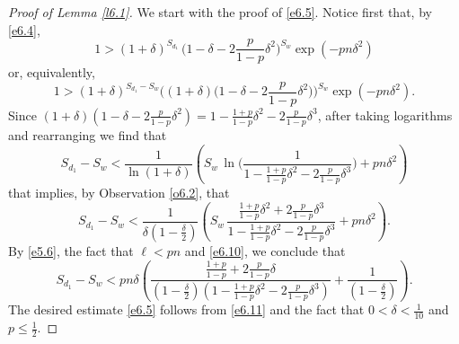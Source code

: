 \documentclass[10pt,a4paper]{amsart}
\theoremstyle{remark}
\newcommand{\mik}{\leqslant}
\begin{document}
\begin{proof}[Proof of Lemma \emph{\ref{l6.1}}]
We start with the proof of \eqref{e6.5}. Notice first that, by \eqref{e6.4},
\begin{equation} \label{e6.7}
1 > (1+\delta)^{S_{d_1}} \, \Big(1-\delta-2\frac{p}{1-p}\delta^2\Big)^{S_w}\exp(-pn\delta^2)
\end{equation}
or, equivalently,
\begin{equation} \label{e6.8}
1 >(1+\delta)^{S_{d_1}-S_w}
\Big((1+\delta) \big(1-\delta-2\frac{p}{1-p}\delta^2\big)\Big)^{S_w} \exp(-pn\delta^2).
\end{equation}
Since $(1+\delta)(1-\delta-2\frac{p}{1-p}\delta^2)=1-\frac{1+p}{1-p}\delta^2-2\frac{p}{1-p}\delta^3$,
after taking logarithms and rearranging we find that
\begin{equation} \label{e6.9}
S_{d_1}-S_w < \frac{1}{\ln(1+\delta)}
\left(S_w\, \ln\Big(\frac{1}{1-\frac{1+p}{1-p}\delta^2-2\frac{p}{1-p}\delta^3}\Big)+pn\delta^2\right)
\end{equation}
that implies, by Observation \ref{o6.2}, that
\begin{equation} \label{e6.10}
S_{d_1}-S_w < \frac{1}{\delta(1-\frac{\delta}{2})} \left( S_w \, \frac{\frac{1+p}{1-p}\delta^2+2\frac{p}{1-p}\delta^3}{1-\frac{1+p}{1-p}\delta^2-2\frac{p}{1-p}\delta^3}
+pn\delta^2\right).
\end{equation}
By \eqref{e5.6}, the fact that $\ell< pn$ and \eqref{e6.10}, we conclude that
\begin{equation} \label{e6.11}
S_{d_1}-S_w<pn\delta \left(\frac{\frac{1+p}{1-p}+2\frac{p}{1-p}\delta}{\left(1-\frac{\delta}{2}\right)
\left(1-\frac{1+p}{1-p}\delta^2-2\frac{p}{1-p}\delta^3\right)}+\frac{1}{\left(1-\frac{\delta}{2}\right)}\right).
\end{equation}
The desired estimate \eqref{e6.5} follows from \eqref{e6.11} and the fact that $0<\delta<\frac{1}{10}$ and $p\mik \frac12$.


\end{proof}
\end{document}
